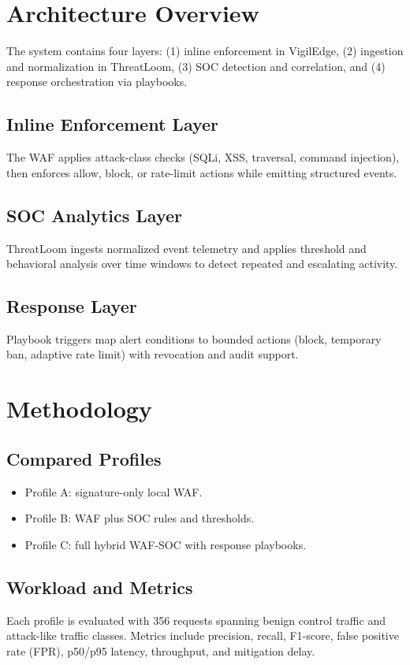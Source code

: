 \documentclass[conference]{IEEEtran}
\begin{document}
\section{Architecture Overview}
The system contains four layers: (1) inline enforcement in VigilEdge, (2) ingestion and normalization in ThreatLoom, (3) SOC detection and correlation, and (4) response orchestration via playbooks.

\subsection{Inline Enforcement Layer}
The WAF applies attack-class checks (SQLi, XSS, traversal, command injection), then enforces allow, block, or rate-limit actions while emitting structured events.

\subsection{SOC Analytics Layer}
ThreatLoom ingests normalized event telemetry and applies threshold and behavioral analysis over time windows to detect repeated and escalating activity.

\subsection{Response Layer}
Playbook triggers map alert conditions to bounded actions (block, temporary ban, adaptive rate limit) with revocation and audit support.

\section{Methodology}
\subsection{Compared Profiles}
\begin{itemize}
\item Profile A: signature-only local WAF.
\item Profile B: WAF plus SOC rules and thresholds.
\item Profile C: full hybrid WAF-SOC with response playbooks.
\end{itemize}

\subsection{Workload and Metrics}
Each profile is evaluated with 356 requests spanning benign control traffic and attack-like traffic classes. Metrics include precision, recall, F1-score, false positive rate (FPR), p50/p95 latency, throughput, and mitigation delay.
\end{document}
